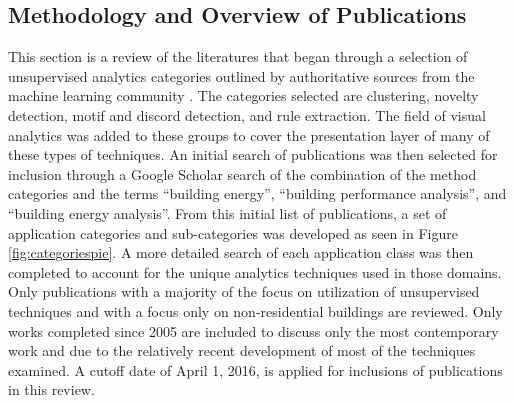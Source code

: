 \subsection{Methodology and Overview of Publications}
\label{overviewofpubs}

This section is a review of the literatures that began through a selection of unsupervised analytics categories outlined by authoritative sources from the machine learning community \citep{hastie_elements_2009,james_introduction_2013,duda_pattern_2012,mirkin_clustering:_2012}. The categories selected are clustering, novelty detection, motif and discord detection, and rule extraction. The field of visual analytics was added to these groups to cover the presentation layer of many of these types of techniques. An initial search of publications was then selected for inclusion through a Google Scholar search of the combination of the method categories and the terms ``building energy'', ``building performance analysis'', and ``building energy analysis''. From this initial list of publications, a set of application categories and sub-categories was developed as seen in Figure \ref{fig:categoriespie}. A more detailed search of each application class was then completed to account for the unique analytics techniques used in those domains. Only publications with a majority of the focus on utilization of unsupervised techniques and with a focus only on non-residential buildings are reviewed. Only works completed since 2005 are included to discuss only the most contemporary work and due to the relatively recent development of most of the techniques examined. A cutoff date of April 1, 2016, is applied for inclusions of publications in this review.
